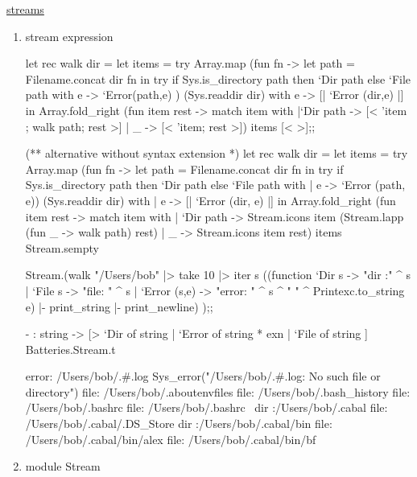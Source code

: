 

\href{http://mirror.ocamlcore.org/ocaml-tutorial.org/streams.html}{streams}

\begin{enumerate}
\item stream expression

  \begin{redcode}

let rec walk dir = 
    let items = try 
      Array.map (fun fn -> let path = Filename.concat dir fn in 
             try if Sys.is_directory path then `Dir path else `File path
             with e -> `Error(path,e) ) (Sys.readdir dir)
      with e -> [| `Error (dir,e) |] in 
      Array.fold_right 
        (fun item rest -> match item with 
            |`Dir path -> [< 'item ; walk path; rest >]
            | _ -> [< 'item; rest >]) items [< >];;


(** alternative without syntax extension *)
let rec walk dir =
  let items =
    try
      Array.map
        (fun fn ->
           let path = Filename.concat dir fn
           in
             try if Sys.is_directory path then `Dir path else `File path
             with | e -> `Error (path, e))
        (Sys.readdir dir)
    with | e -> [| `Error (dir, e) |]
  in
    Array.fold_right
      (fun item rest ->
         match item with
         | `Dir path ->
             Stream.icons item (Stream.lapp (fun _ -> walk path) rest)
         | _ -> Stream.icons item rest)
      items Stream.sempty


            
Stream.(walk "/Users/bob" |> take 10 |> iter 
s      ((function `Dir s -> "dir :" ^ s | `File s -> "file: " ^ s | `Error (s,e) -> "error: " ^ s ^ " " ^ Printexc.to_string e) |- print_string |- print_newline) );;
            
   \end{redcode}
   
   \begin{bluecode}
- : string ->
    [> `Dir of string | `Error of string * exn | `File of string ]
    Batteries.Stream.t

error: /Users/bob/.#.log Sys_error("/Users/bob/.#.log: No such file or directory")
file: /Users/bob/.aboutenvfiles
file: /Users/bob/.bash_history
file: /Users/bob/.bashrc
file: /Users/bob/.bashrc~
dir :/Users/bob/.cabal
file: /Users/bob/.cabal/.DS_Store
dir :/Users/bob/.cabal/bin
file: /Users/bob/.cabal/bin/alex
file: /Users/bob/.cabal/bin/bf

    
 \end{bluecode}
\item module Stream



\end{enumerate}
